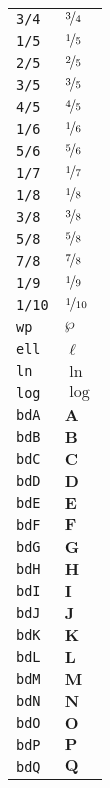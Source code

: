 \begin{longtable}{ll}
\texttt{3/4}&${}\nicefrac{3}{4} {}$\\
\texttt{1/5}&${}\nicefrac{1}{5} {}$\\
\texttt{2/5}&${}\nicefrac{2}{5} {}$\\
\texttt{3/5}&${}\nicefrac{3}{5} {}$\\
\texttt{4/5}&${}\nicefrac{4}{5} {}$\\
\texttt{1/6}&${}\nicefrac{1}{6} {}$\\
\texttt{5/6}&${}\nicefrac{5}{6} {}$\\
\texttt{1/7}&${}\nicefrac{1}{7} {}$\\
\texttt{1/8}&${}\nicefrac{1}{8} {}$\\
\texttt{3/8}&${}\nicefrac{3}{8} {}$\\
\texttt{5/8}&${}\nicefrac{5}{8} {}$\\
\texttt{7/8}&${}\nicefrac{7}{8} {}$\\
\texttt{1/9}&${}\nicefrac{1}{9} {}$\\
\texttt{1/10}&${}\nicefrac{1}{10} {}$\\
\texttt{wp}&${}\wp {}$\\
\texttt{ell}&${}\ell {}$\\
\texttt{ln}&${}\ln {}$\\
\texttt{log}&${}\log {}$\\
\texttt{bdA}&${}{\textbf{A}}{}$\\
\texttt{bdB}&${}{\textbf{B}}{}$\\
\texttt{bdC}&${}{\textbf{C}}{}$\\
\texttt{bdD}&${}{\textbf{D}}{}$\\
\texttt{bdE}&${}{\textbf{E}}{}$\\
\texttt{bdF}&${}{\textbf{F}}{}$\\
\texttt{bdG}&${}{\textbf{G}}{}$\\
\texttt{bdH}&${}{\textbf{H}}{}$\\
\texttt{bdI}&${}{\textbf{I}}{}$\\
\texttt{bdJ}&${}{\textbf{J}}{}$\\
\texttt{bdK}&${}{\textbf{K}}{}$\\
\texttt{bdL}&${}{\textbf{L}}{}$\\
\texttt{bdM}&${}{\textbf{M}}{}$\\
\texttt{bdN}&${}{\textbf{N}}{}$\\
\texttt{bdO}&${}{\textbf{O}}{}$\\
\texttt{bdP}&${}{\textbf{P}}{}$\\
\texttt{bdQ}&${}{\textbf{Q}}{}$\\

\end{longtable}
